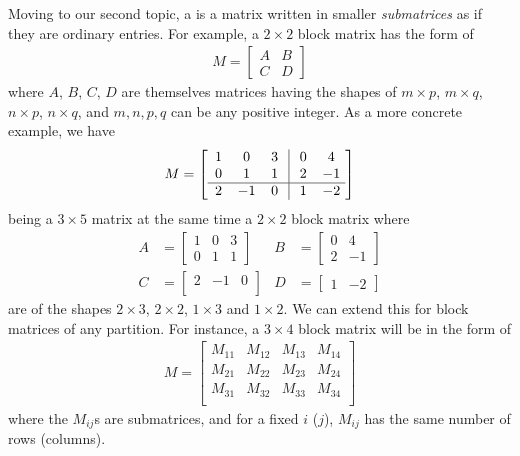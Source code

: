 Moving to our second topic, a  is a matrix written in smaller \textit{submatrices} as if they are ordinary entries. For example, a $2 \times 2$ block matrix has the form of
\begin{align*}
M =
\begin{bmatrix}
A & B \\
C & D
\end{bmatrix}
\end{align*}
where $A$, $B$, $C$, $D$ are themselves matrices having the shapes of $m \times p$, $m \times q$, $n \times p$, $n \times q$, and $m, n, p, q$ can be any positive integer. As a more concrete example, we have
\begin{align*}
M = 
\left[\begin{array}{@{\;}wc{10pt}wc{10pt}wc{10pt}|wc{10pt}wc{10pt}}
1 & 0 & 3 & 0 & 4 \\
0 & 1 & 1 & 2 & -1 \\
\hline
2 & -1 & 0 & 1 & -2 \\
\end{array}\right]
\end{align*}
being a $3 \times 5$ matrix at the same time a $2 \times 2$ block matrix where
\begin{align*}
A &= \begin{bmatrix}
1 & 0 & 3 \\
0 & 1 & 1
\end{bmatrix}
& 
B &= \begin{bmatrix}
0 & 4 \\
2 & -1
\end{bmatrix} \\
C &= \begin{bmatrix}
2 & -1 & 0 \\
\end{bmatrix}
& 
D &= \begin{bmatrix}
1 & -2
\end{bmatrix}
\end{align*}
are of the shapes $2 \times 3$, $2 \times 2$, $1 \times 3$ and $1 \times 2$. We can extend this for block matrices of any partition. For instance, a $3 \times 4$ block matrix will be in the form of
\begin{align*}
M =
\begin{bmatrix}
M_{11} & M_{12} & M_{13} & M_{14} \\
M_{21} & M_{22} & M_{23} & M_{24} \\
M_{31} & M_{32} & M_{33} & M_{34} \\
\end{bmatrix}
\end{align*}
where the $M_{ij}$s are submatrices, and for a fixed $i$ ($j$), $M_{ij}$ has the same number of rows (columns).

